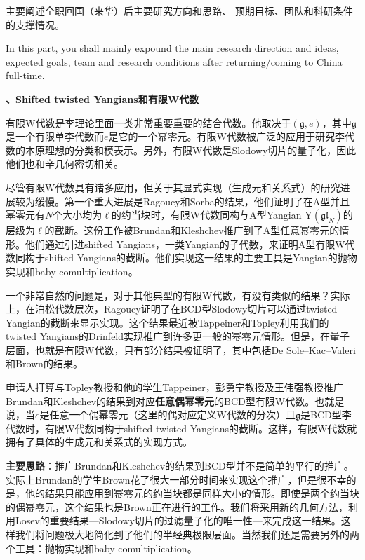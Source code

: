 \documentclass[12pt,UTF8,AutoFakeBold=4,a4paper]{ctexart}
\begin{document}
{\sihao \color{MsBlue} \kaishu 主要阐述全职回国（来华）后主要研究方向和思路、
预期目标、团队和科研条件的支撑情况。}

{\color{MsBlue}  
In this part, you shall mainly expound the main research direction and ideas, 
expected goals, team and research conditions after returning/coming to China 
full-time.}

\medskip

\textbf{、Shifted twisted Yangians和有限W代数}

有限W代数是李理论里面一类非常重要重要的结合代数。他取决于$(\mathfrak g,e)$，其中$\mathfrak g$是一个有限单李代数而$e$是它的一个幂零元。有限W代数被广泛的应用于研究李代数的本原理想的分类和模表示。另外，有限W代数是Slodowy切片的量子化，因此他们也和辛几何密切相关。

尽管有限W代数具有诸多应用，但关于其显式实现（生成元和关系式）的研究进展较为缓慢。第一个重大进展是Ragoucy和Sorba的结果，他们证明了在A型并且幂零元有$N$个大小均为$\ell$的约当块时，有限W代数同构与A型Yangian $\mathrm{Y}(\mathfrak{gl}_N)$的层级为$\ell$的截断。这份工作被Brundan和Kleshchev推广到了A型任意幂零元的情形。他们通过引进shifted Yangians，一类Yangian的子代数，来证明A型有限W代数同构于shifted Yangians的截断。他们实现这一结果的主要工具是Yangian的抛物实现和baby comultiplication。

一个非常自然的问题是，对于其他典型的有限W代数，有没有类似的结果？实际上，在泊松代数层次，Ragoucy证明了在BCD型Slodowy切片可以通过twisted Yangian的截断来显示实现。这个结果最近被Tappeiner和Topley利用我们的twisted Yangians的Drinfeld实现推广到许多更一般的幂零元情形。但是，在量子层面，也就是有限W代数，只有部分结果被证明了，其中包括De Sole–Kac–Valeri和Brown的结果。

申请人打算与Topley教授和他的学生Tappeiner，彭勇宁教授及王伟强教授推广Brundan和Kleshchev的结果到对应\textbf{任意偶幂零元}的BCD型有限W代数。也就是说，当$e$是任意一个偶幂零元（这里的偶对应定义W代数的分次）且$\mathfrak g$是BCD型李代数时，有限W代数同构于shifted twisted Yangians的截断。这样，有限W代数就拥有了具体的生成元和关系式的实现方式。

\textbf{主要思路}：推广Brundan和Kleshchev的结果到BCD型并不是简单的平行的推广。实际上Brundan的学生Brown花了很大一部分时间来实现这个推广，但是很不幸的是，他的结果只能应用到幂零元的约当块都是同样大小的情形。即使是两个约当块的偶幂零元，这个结果也是Brown正在进行的工作。我们将采用新的几何方法，利用Losev的重要结果---Slodowy切片的过滤量子化的唯一性---来完成这一结果。这样我们将问题极大地简化到了他们的半经典极限层面。当然我们还是需要另外的两个工具：抛物实现和baby comultiplication。
\end{document}
